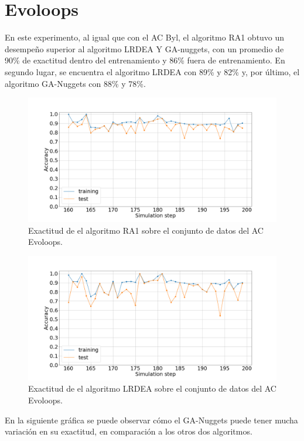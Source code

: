 \section{Evoloops}
En este experimento, al igual que con el AC Byl, el algoritmo RA1 obtuvo un desempeño superior al algoritmo LRDEA Y GA-nuggets, con un promedio de 90\% de exactitud dentro del entrenamiento y 86\% fuera de entrenamiento. En segundo lugar, se encuentra el algoritmo LRDEA con 89\% y 82\% y, por último, el algoritmo GA-Nuggets con 88\% y 78\%.
\begin{figure}[H]
	\centering
	\includegraphics[width=\linewidth]{fig/ra1_6}
	\caption{Exactitud de el algoritmo RA1 sobre el conjunto de datos del AC Evoloops.}
	\label{fig:ra1evoloops}
\end{figure}
\begin{figure}[H]
	\centering
	\includegraphics[width=\linewidth]{fig/LRDEA_7}
	\caption{Exactitud de el algoritmo LRDEA sobre el conjunto de datos del AC Evoloops.}
	\label{fig:lrdeaevoloops}
\end{figure}

En la siguiente gráfica se puede observar cómo el GA-Nuggets puede tener mucha variación en su exactitud, en comparación a los otros dos algoritmos.


